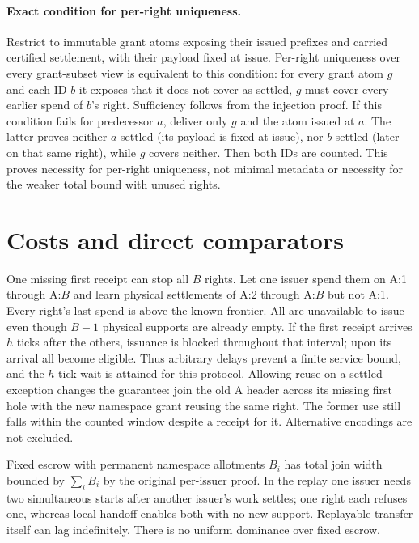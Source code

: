 \documentclass[11pt]{article}
\begin{document}
\paragraph{Exact condition for per-right uniqueness.}
Restrict to immutable grant atoms exposing their issued prefixes and carried certified settlement, with their payload fixed at issue. Per-right uniqueness over every grant-subset view is equivalent to this condition: for every grant atom $g$ and each ID $b$ it exposes that it does not cover as settled, $g$ must cover every earlier spend of $b$'s right. Sufficiency follows from the injection proof. If this condition fails for predecessor $a$, deliver only $g$ and the atom issued at $a$. The latter proves neither $a$ settled (its payload is fixed at issue), nor $b$ settled (later on that same right), while $g$ covers neither. Then both IDs are counted. This proves necessity for per-right uniqueness, not minimal metadata or necessity for the weaker total bound with unused rights.

\section{Costs and direct comparators}
One missing first receipt can stop all $B$ rights. Let one issuer spend them on A:1 through A:$B$ and learn physical settlements of A:2 through A:$B$ but not A:1. Every right's last spend is above the known frontier. All are unavailable to issue even though $B-1$ physical supports are already empty. If the first receipt arrives $h$ ticks after the others, issuance is blocked throughout that interval; upon its arrival all become eligible. Thus arbitrary delays prevent a finite service bound, and the $h$-tick wait is attained for this protocol. Allowing reuse on a settled exception changes the guarantee: join the old A header across its missing first hole with the new namespace grant reusing the same right. The former use still falls within the counted window despite a receipt for it. Alternative encodings are not excluded.

Fixed escrow with permanent namespace allotments $B_i$ has total join width bounded by $\sum_i B_i$ by the original per-issuer proof. In the replay one issuer needs two simultaneous starts after another issuer's work settles; one right each refuses one, whereas local handoff enables both with no new support. Replayable transfer itself can lag indefinitely. There is no uniform dominance over fixed escrow.
\end{document}
